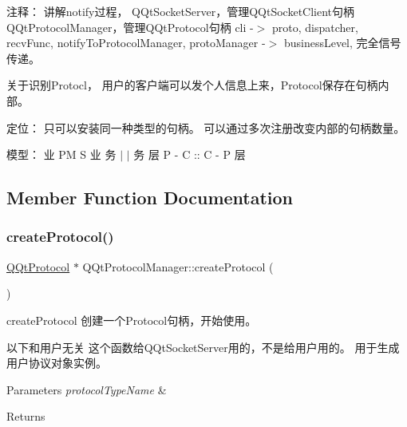 注释： 讲解notify过程， Q\+Qt\+Socket\+Server，管理\+Q\+Qt\+Socket\+Client句柄 Q\+Qt\+Protocol\+Manager，管理\+Q\+Qt\+Protocol句柄 cli -\/$>$ proto, dispatcher, recv\+Func, notify\+To\+Protocol\+Manager, proto\+Manager -\/$>$ business\+Level, 完全信号传递。

关于识别\+Protocl， 用户的客户端可以发个人信息上来，\+Protocol保存在句柄内部。

定位： 只可以安装同一种类型的句柄。 可以通过多次注册改变内部的句柄数量。

模型： 业 PM S 业 务 $\vert$ $\vert$ 务 层 P -\/ C \+:\+: C -\/ P 层 

\subsection{Member Function Documentation}
\mbox{\label{class_q_qt_protocol_manager_ad9338cb29423bcb27e028b2fcc172111}} 
\subsubsection{\texorpdfstring{create\+Protocol()}{createProtocol()}}
{\footnotesize\ttfamily \mbox{\hyperlink{class_q_qt_protocol}{Q\+Qt\+Protocol}} $\ast$ Q\+Qt\+Protocol\+Manager\+::create\+Protocol (\begin{DoxyParamCaption}{ }\end{DoxyParamCaption})}



create\+Protocol 创建一个\+Protocol句柄，开始使用。 

以下和用户无关 这个函数给\+Q\+Qt\+Socket\+Server用的，不是给用户用的。 用于生成用户协议对象实例。


\begin{DoxyParams}{Parameters}
{\em protocol\+Type\+Name} & \\
\hline
\end{DoxyParams}
\begin{DoxyReturn}{Returns}

\end{DoxyReturn}
\mbox{\label{class_q_qt_protocol_manager_a144c24a9597d4fd2618b20f3389497f1}} 
